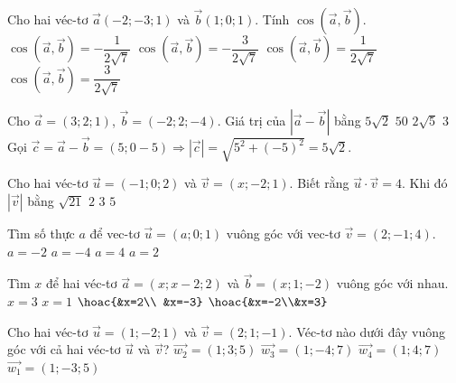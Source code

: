 \begin{ex}
	Cho hai véc-tơ $ \vec{a}(-2;-3;1) $ và $ \vec{b}(1;0;1) $. Tính $ \cos(\vec{a},\vec{b}) $.
	\choice
	{\True $ \cos(\vec{a},\vec{b})=-\dfrac{1}{2\sqrt{7}} $}
	{$ \cos(\vec{a},\vec{b})=-\dfrac{3}{2\sqrt{7}} $}
	{$ \cos(\vec{a},\vec{b})=\dfrac{1}{2\sqrt{7}} $}
	{$ \cos(\vec{a},\vec{b})=\dfrac{3}{2\sqrt{7}} $}
\end{ex} 

\begin{ex}
	Cho $\vec{a}=(3;2;1)$, $\vec{b}=(-2;2;-4)$. Giá trị của $\left| \vec{a}-\vec{b} \right|$ bằng
	\choice
	{\True$5\sqrt{2}$}
	{$50$}
	{$2\sqrt{5}$}
	{$3$}
	\loigiai
	{
		Gọi $\vec{c}=\vec{a}-\vec{b}=(5;0-5)\Rightarrow \left| \vec{c} \right|=\sqrt{5^2+(-5)^2}=5\sqrt{2}$.}
\end{ex} 

\begin{ex}
	Cho hai véc-tơ $\vec{u}=(-1;0;2)$ và $\vec{v}=(x;-2;1)$. Biết rằng $\vec{u}\cdot \vec{v}=4$. Khi đó $|\vec{v}|$ bằng
	\choice
	{$\sqrt{21}$}
	{$2$}
	{\True $3$}
	{$5$}
\end{ex} 

\begin{ex}%
	Tìm số thực $a$ để vec-tơ $\vec{u}=(a;0;1)$ vuông góc với vec-tơ $\vec{v}=(2;-1;4)$.
	\choice
	{\True $a=-2$}
	{$a=-4$}
	{$a=4$}
	{$a=2$}
\end{ex} 

\begin{ex}
	Tìm $x$ để hai véc-tơ $\vec{a}=(x;x-2;2)$ và $\vec{b}=(x;1;-2)$ vuông góc với nhau.
	\choice
	{$x=3$}
	{$x=1$}
	{\True $\hoac{&x=2\\ &x=-3}$}
	{$\hoac{&x=-2\\&x=3}$}
\end{ex} 

\begin{ex}
	Cho hai véc-tơ $\vec{u}=(1;-2;1)$ và $\vec{v}=(2;1;-1)$. Véc-tơ nào dưới đây vuông góc với cả hai véc-tơ $\vec{u}$ và $\vec{v}$?
	\choice
	{\True $\vec{w_2}=(1;3;5)$}
	{$\vec{w_3}=(1;-4;7)$}
	{$\vec{w_4}=(1;4;7)$}
	{$\vec{w_1}=(1;-3;5)$}
\end{ex} 


